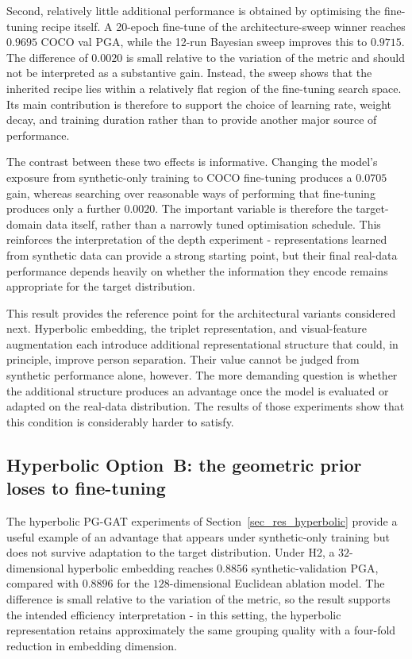 Second, relatively little additional performance is obtained by
optimising the fine-tuning recipe itself.
A 20-epoch fine-tune of the architecture-sweep winner reaches $0.9695$
COCO val PGA,
while the 12-run Bayesian sweep improves this to $0.9715$.
The difference of $0.0020$ is small relative to the variation of the
metric and should not be interpreted as a substantive gain.
Instead, the sweep shows that the inherited recipe lies within a
relatively flat region of the fine-tuning search space.
Its main contribution is therefore to support the choice of learning
rate,
weight decay,
and training duration rather than to provide another major source
of performance.

The contrast between these two effects is informative.
Changing the model's exposure from synthetic-only training to COCO
fine-tuning produces a $0.0705$ gain,
whereas searching over reasonable ways of performing that fine-tuning
produces only a further $0.0020$.
The important variable is therefore the target-domain data itself,
rather than a narrowly tuned optimisation schedule.
This reinforces the interpretation of the depth experiment -
representations learned from synthetic data can provide a strong
starting point,
but their final real-data performance depends heavily on whether the
information they encode remains appropriate for the target distribution.

This result provides the reference point for the architectural variants
considered next.
Hyperbolic embedding,
the triplet representation,
and visual-feature augmentation each introduce additional
representational structure that could, in principle, improve person
separation.
Their value cannot be judged from synthetic performance alone, however.
The more demanding question is whether the additional structure produces
an advantage once the model is evaluated or adapted on the real-data
distribution.
The results of those experiments show that this condition is
considerably harder to satisfy.

\subsection{Hyperbolic Option~B: the geometric prior loses to fine-tuning}
\label{sec_disc_transfer_hyperbolic}

The hyperbolic PG-GAT experiments of Section~\ref{sec_res_hyperbolic}
provide a useful example of an advantage that appears under
synthetic-only training but does not survive adaptation to the target
distribution.
Under H2, a $32$-dimensional hyperbolic embedding reaches $0.8856$
synthetic-validation PGA,
compared with $0.8896$ for the $128$-dimensional Euclidean ablation
model.
The difference is small relative to the variation of the metric,
so the result supports the intended efficiency interpretation -
in this setting, the hyperbolic representation retains approximately
the same grouping quality with a four-fold reduction in embedding
dimension.

